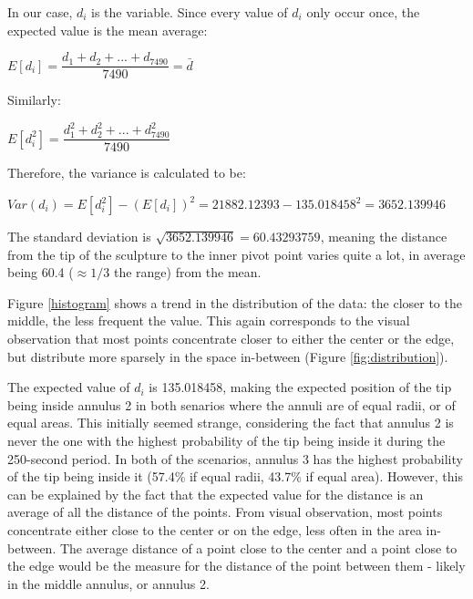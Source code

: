\documentclass[a4paper,12pt]{article}
\begin{document}
    In our case, $d_i$ is the variable. Since every value of $d_i$ only occur once, the expected value is the mean average:

    \begin{center}
        $E[d_i]=\dfrac{d_1+d_2+...+d_{7490}}{7490}=\bar d$
    \end{center}

    Similarly:

    \begin{center}
        $E[d_i^2]=\dfrac{d_1^2+d_2^2+...+d_{7490}^2}{7490}$
    \end{center}

    Therefore, the variance is calculated to be:

    \begin{center}
        $Var(d_i)=E[d_i^2]-(E[d_i])^2= 21882.12393-135.018458^2=3652.139946$
    \end{center}

    The standard deviation is $\sqrt{3652.139946}=60.43293759$, meaning the distance from the tip of the sculpture to the inner pivot point varies quite a lot, in average being 60.4 ($\approx1/3$ the range) from the mean.

    Figure \ref{histogram} shows a trend in the distribution of the data: the closer to the middle, the less frequent the value. This again corresponds to the visual observation that most points concentrate closer to either the center or the edge, but distribute more sparsely in the space in-between (Figure \ref{fig:distribution}).

    The expected value of $d_i$ is 135.018458, making the expected position of the tip being inside annulus 2 in both senarios where the annuli are of equal radii, or of equal areas. This initially seemed strange, considering the fact that annulus 2 is never the one with the highest probability of the tip being inside it during the 250-second period. In both of the scenarios, annulus 3 has the highest probability of the tip being inside it (57.4\% if equal radii, 43.7\% if equal area). However, this can be explained by the fact that the expected value for the distance is an average of all the distance of the points. From visual observation, most points concentrate either close to the center or on the edge, less often in the area in-between. The average distance of a point close to the center and a point close to the edge would be the measure for the distance of the point between them - likely in the middle annulus, or annulus 2.
\end{document}
